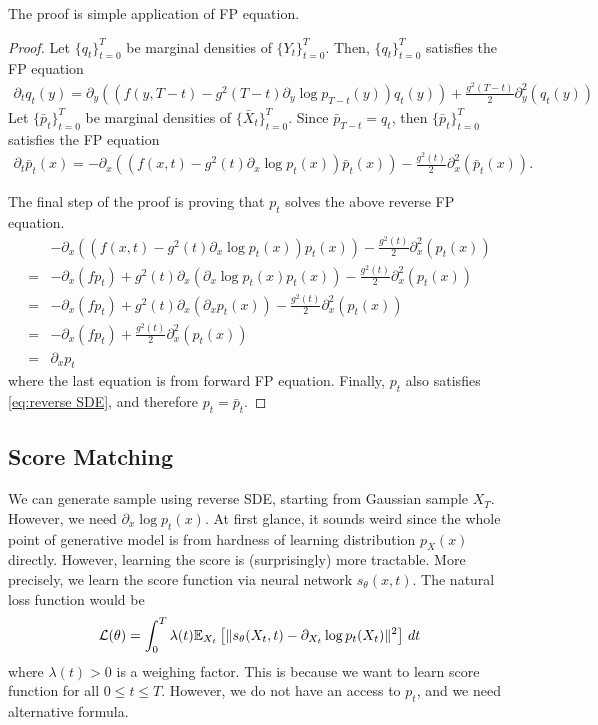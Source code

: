 \documentclass[11pt]{article}
\begin{document}
The proof is simple application of FP equation.
\begin{proof}
    Let $\{q_t\}_{t=0}^T$ be marginal densities of $\{Y_t\}_{t=0}^T$.
    Then, $\{q_t\}_{t=0}^T$ satisfies the FP equation
    \begin{align}
        \partial_t q_t(y) = \partial_y \left((f(y, T-t) - g^2(T-t)\partial_y \log p_{T-t}(y))q_t(y)\right) + \frac{g^2(T-t)}{2} \partial_y^2(q_t(y))
    \end{align}
    Let $\{\bar{p}_t\}_{t=0}^T$ be marginal densities of $\{\bar{X}_t\}_{t=0}^T$.
    Since $\bar{p}_{T-t} = q_t$, then $\{\bar{p}_t\}_{t=0}^T$ satisfies the FP equation
    \begin{align}
        \partial_t \bar{p}_t(x) = -\partial_x \left((f(x, t) - g^2(t)\partial_x \log p_{t}(x))\bar{p}_t(x)\right) - \frac{g^2(t)}{2} \partial_x^2(\bar{p}_t(x)).
        \label{eq:reverse SDE}
    \end{align}

    The final step of the proof is proving that $p_t$ solves the above reverse FP equation.
    \begin{align}
        &-\partial_x \left((f(x, t) - g^2(t)\partial_x \log p_{t}(x))p_t(x)\right) - \frac{g^2(t)}{2} \partial_x^2(p_t(x))\\
        =& -\partial_x (fp_t) + g^2(t)\partial_x (\partial_x\log p_{t}(x)p_t(x)) - \frac{g^2(t)}{2} \partial_x^2(p_t(x))\\
        =& -\partial_x (fp_t) + g^2(t)\partial_x (\partial_x p_{t}(x)) - \frac{g^2(t)}{2} \partial_x^2(p_t(x))\\
        =&  -\partial_x (f p_t) + \frac{g^2(t)}{2}\partial_x^2 (p_t(x))\\
        =& \partial_x p_t
    \end{align}
    where the last equation is from forward FP equation.
    Finally, $p_t$ also satisfies \eqref{eq:reverse SDE}, and therefore $p_t = \bar{p}_t$.
\end{proof}

\subsection{Score Matching}
We can generate sample using reverse SDE, starting from Gaussian sample $X_T$.
However, we need $\partial_x \log p_t(x)$.
At first glance, it sounds weird since the whole point of generative model is from hardness of learning distribution $p_X(x)$ directly.
However, learning the score is (surprisingly) more tractable.
More precisely, we learn the score function via neural network $s_\theta(x, t)$.
The natural loss function would be
\begin{align}
    {\cal L}(\theta) = \int_0^T \lambda(t) \mathbb{E}_{X_t}\left[ \| s_\theta(X_t, t)  - \partial_{X_t} \log p_t(X_t)\|^2 \right]\, dt
\end{align}
where $\lambda(t)>0$ is a weighing factor.
This is because we want to learn score function for all $0\leq t\leq T$.
However, we do not have an access to $p_t$, and we need alternative formula.
\end{document}
